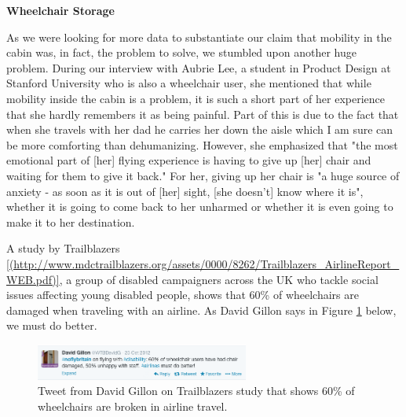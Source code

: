 \textbf{Wheelchair Storage}

As we were looking for more data to substantiate our claim that mobility in the cabin was, in fact, the problem to solve, we stumbled upon another huge problem. During our interview with Aubrie Lee, a student in Product Design at Stanford University who is also a wheelchair user, she mentioned that while mobility inside the cabin is a problem, it is such a short part of her experience that she hardly remembers it as being painful. Part of this is due to the fact that when she travels with her dad he carries her down the aisle which I am sure can be more comforting than dehumanizing. However, she emphasized that "the most emotional part of [her] flying experience is having to give up [her] chair and waiting for them to give it back." For her, giving up her chair is "a huge source of anxiety - as soon as it is out of [her] sight, [she doesn't] know where it is", whether it is going to come back to her unharmed or whether it is even going to make it to her destination. 

A study by Trailblazers \ref{(http://www.mdctrailblazers.org/assets/0000/8262/Trailblazers_AirlineReport_WEB.pdf)}, a group of disabled campaigners across the UK who tackle social issues affecting young disabled people, shows that 60\% of wheelchairs are damaged when traveling with an airline. As David Gillon says in Figure \ref{fig:60percenttweet.png} below, we must do better. 


\begin{figure}[h]
  \centering
     \includegraphics[width=7cm]{images/60percenttweet.png}
   \caption{Tweet from David Gillon on Trailblazers study that shows 60\% of wheelchairs are broken in airline travel. }
  \label{fig:60percenttweet.png}
\end{figure}

